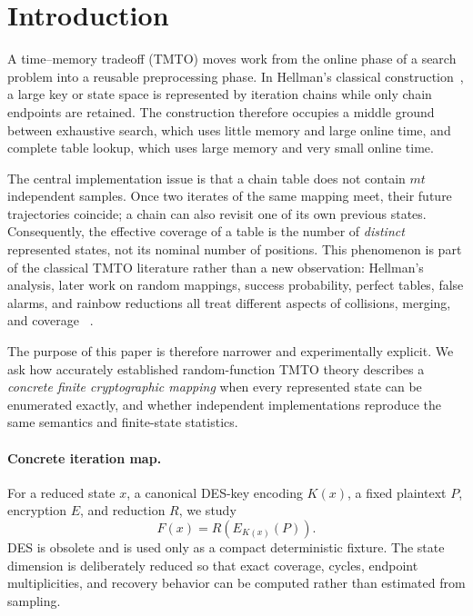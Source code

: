\section{Introduction}

A time--memory tradeoff (TMTO) moves work from the online phase of a search
problem into a reusable preprocessing phase.  In Hellman's classical
construction~\cite{Hellman1980}, a large key or state space is represented by
iteration chains while only chain endpoints are retained.  The construction
therefore occupies a middle ground between exhaustive search, which uses little
memory and large online time, and complete table lookup, which uses large
memory and very small online time.

The central implementation issue is that a chain table does not contain
$m t$ independent samples.  Once two iterates of the same mapping meet, their
future trajectories coincide; a chain can also revisit one of its own previous
states.  Consequently, the effective coverage of a table is the number of
\emph{distinct} represented states, not its nominal number of positions.
This phenomenon is part of the classical TMTO literature rather than a new
observation: Hellman's analysis, later work on random mappings, success
probability, perfect tables, false alarms, and rainbow reductions all treat
different aspects of collisions, merging, and coverage
~\cite{Hellman1980,FlajoletOdlyzko1990,Oechslin2003,AvoineJunodOechslin2008,MaHong2009,Hong2008}.

The purpose of this paper is therefore narrower and experimentally explicit.
We ask how accurately established random-function TMTO theory describes a
\emph{concrete finite cryptographic mapping} when every represented state can
be enumerated exactly, and whether independent implementations reproduce the
same semantics and finite-state statistics.

\paragraph{Concrete iteration map.}
For a reduced state $x$, a canonical DES-key encoding $K(x)$, a fixed plaintext
$P$, encryption $E$, and reduction $R$, we study
\[
    F(x)=R(E_{K(x)}(P)).
\]
DES is obsolete and is used only as a compact deterministic fixture.  The state
dimension is deliberately reduced so that exact coverage, cycles, endpoint
multiplicities, and recovery behavior can be computed rather than estimated
from sampling.

